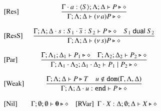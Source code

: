 \begin{figure}[t]
\[\begin{array}{lc}
%

		\trule{Res}& \tree{
			\Gamma\cat a:\chtype{S} ; \Lambda; \Delta \proves P \hastype \Proc
		}{
			\Gamma; \Lambda; \Delta \proves \news{a} P \hastype \Proc}
\\[6mm]
		\trule{ResS}& \tree{
			\Gamma; \Lambda; \Delta \cat s:S_1 \cat \dual{s}: S_2 \proves P \hastype \Proc \quad S_1 \dualof S_2
		}{
			\Gamma; \Lambda; \Delta \proves \news{s} P \hastype \Proc
		}
		\\[6mm]

		\trule{Par}& \tree{
			\Gamma; \Lambda_{1}; \Delta_{1} \proves P_{1} \hastype \Proc \quad \Gamma; \Lambda_{2}; \Delta_{2} \proves P_{2} \hastype \Proc
		}{
			\Gamma; \Lambda_{1} \cat \Lambda_2; \Delta_{1} \cat \Delta_2 \proves P_1 \Par P_2 \hastype \Proc
		}
\\[6mm]
		\trule{Weak}& \tree{
			\Gamma; \Lambda; \Delta  \proves P \hastype T \quad u \not\in \dom{\Gamma, \Lambda,\Delta}
		}{
			\Gamma; \Lambda; \Delta \cat u: \tinact  \proves P \hastype \Proc
		}
		\\[6mm]

		\trule{Nil}& \Gamma; \emptyset; \emptyset \proves \inact \hastype \Proc
\quad 
		\trule{RVar}~~\Gamma \cat \rvar{X}: \Delta; \emptyset; \Delta  \proves \rvar{X} \hastype \Proc
\\[4mm]


\end{array}\]
\end{figure}
